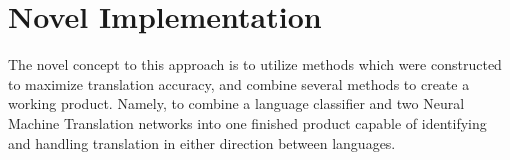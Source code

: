\documentclass[10pt,a4paper]{report}
\begin{document}
\section{Novel Implementation}
The novel concept to this approach is to utilize methods which were constructed to maximize translation accuracy, and combine several methods to create a working product. Namely, to combine a language classifier and two Neural Machine Translation networks into one finished product capable of identifying and handling translation in either direction between languages.
\end{document}
